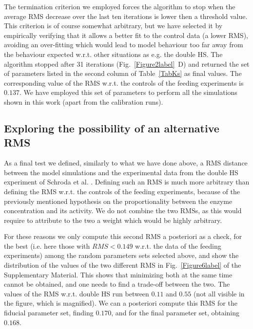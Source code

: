 \documentclass[oneside, 10pt, a4paper, twocolumn]{article}
\begin{document}
The termination criterion we employed {forces} the algorithm to stop when the average RMS decrease over the last ten iterations is lower then a threshold value. This criterion is of course somewhat arbitrary, but we have selected it by empirically verifying that it allows a better fit to the control data (a lower RMS), avoiding an over-fitting which would lead to model behaviour too far away from the behaviour expected w.r.t. other situations as e.g. the double HS. %
The algorithm stopped after 31 iterations (Fig.~\ref{Figure2label}~D) and returned the set of parameters listed in the second column of Table~\ref{TabKs} as final values. The corresponding value of the RMS w.r.t. the controls of the feeding experiments is $0.137$.  We have employed this set of parameters to perform all the simulations shown in this work ({apart} from the calibration runs).




\subsection{Exploring the possibility of an alternative RMS}
\label{sectionRMS2HS}

As a final test we defined, similarly to what we have done above, a RMS distance between the model simulations and the experimental data from the double HS experiment of Schroda et al. \cite{Schroda2000}. Defining such an RMS is much more arbitrary than defining the RMS w.r.t. the controls of the feeding experiments, because of the previously mentioned hypothesis on the proportionality between the enzyme concentration and its activity. %
We do not combine the two RMSs, as this would require to attribute to the two a weight which would be highly arbitrary. 

For these reasons we only compute this second RMS a posteriori as a check, for the best {(i.e. here those with $RMS < 0.149$ w.r.t. the data of the feeding experiments)} among the random parameters sets selected above, and show the distribution of the values of the two different RMS in Fig.~\ref{Figure6label} of the Supplementary Material. This shows that minimizing both at the same time cannot be obtained, and one needs to find a trade-off between the two. The values of the RMS w.r.t. double HS run between $0.11$ and $0.55$ (not all visible in the figure, which is magnified). We can a posteriori compute this RMS for the fiducial parameter set, finding $0.170$, and for the final parameter set, obtaining $0.168$.
\end{document}
